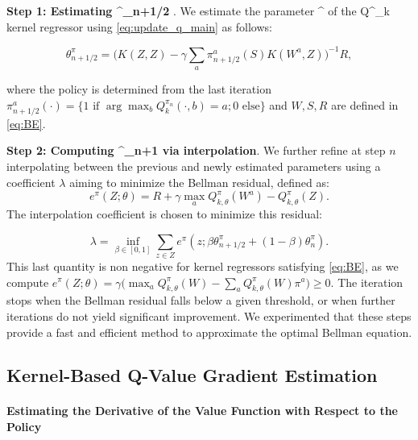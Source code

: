 \documentclass[
]{article}
\def\({}%
\def\){}%
\numberwithin{equation}{section}
\begin{document}
\textbf{Step 1: Estimating \( \theta^{\pi}_{n+1/2} \)}.
We estimate the parameter \( \theta^{\pi} \) of the \( Q^{\pi}_k \) kernel regressor using \eqref{eq:update_q_main} as follows:

\begin{equation} \label{qbell} 
 \theta^{\pi}_{n+1/2} = \Big( K(Z, Z) - \gamma \sum_a \pi_{n+1/2}^a(S) K(W^a,Z)\Big)^{-1} R, 
\end{equation}

where the policy is determined from the last iteration $\pi_{n+1/2}^a (\cdot) =  \{1 \text{ if } \arg \max_b Q^{\pi_n}_k(\cdot,b)=a; 0 \text{ else} \}$ and $W, S, R$ are defined in \eqref{eq:BE}.

\textbf{Step 2: Computing \( \theta^{\pi}_{n+1} \) via interpolation}.
We further refine at step $n$ interpolating between the previous and newly estimated parameters using a coefficient $\lambda$ aiming to minimize the Bellman residual, defined as:
\begin{equation} \label{eq:bel_res}
 e^{\pi}(Z; \theta) = R + \gamma \max_a Q^\pi_{k, \theta}(W^a) - Q^\pi_{k, \theta}(Z).
\end{equation}
The interpolation coefficient \( \lambda \) is chosen to minimize this residual:

\begin{equation}
\lambda = \inf_{\beta \in [0,1]} \sum_{z \in Z} e^\pi(z; \beta \theta^{\pi}_{n+1/2} + (1- \beta)\theta_{n}^{\pi}) \big.
\end{equation}
This last quantity is non negative for kernel regressors satisfying \eqref{eq:BE}, as we compute $e^\pi(Z; \theta) = \gamma \big( \max_a Q^\pi_{k, \theta}(W) - \sum_a Q^\pi_{k, \theta}(W) \pi^a \big)  \ge 0.$ The iteration stops when the Bellman residual falls below a given threshold, or when further iterations do not yield significant improvement. We experimented that these steps provide a fast and efficient method to approximate the optimal Bellman equation.


\hypertarget{Kernel-Based Q-Value Gradient Estimation}{%
\subsection{Kernel-Based Q-Value Gradient Estimation}\label{Kernel-Based Q-Value Gradient Estimation}}

\paragraph*{Estimating the Derivative of the Value Function with Respect to the Policy}
\end{document}
